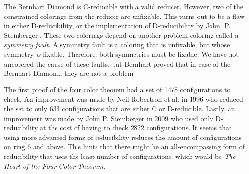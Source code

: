 The Bernhart Diamond is C-reducible with a valid reducer. However, two of the constrained colorings from the reducer are unfixable. This turns out to be a flaw in either D-reducibility, or the implementation of D-reducibility by John. P. Steinberger \cite{johnp}. These two colorings depend on another problem coloring called a \textit{symmetry fault}. A symmetry fault is a coloring that is unfixable, but whose symmetry \textit{is} fixable. Therefore, both symmetries must be fixable. We have not uncovered the cause of these faults, but Bernhart \cite{bernhart} proved that in case of the Bernhart Diamond, they are not a problem.

The first proof of the four color theorem had a set of 1478 configurations to check. An improvement was made by Neil Robertson et al. \cite{thomas} in 1996 who reduced the set to only 633 configurations that are either C or D-reducible. Lastly, an improvement was made by John P. Steinberger in 2009 who used only D-reducibility at the cost of having to check 2822 configurations. It seems that using more advanced forms of reducibility reduces the amount of configurations on ring 6 and above. This hints that there might be an all-encompassing form of reducibility that uses the least number of configurations, which would be \textit{The Heart of the Four Color Theorem}.